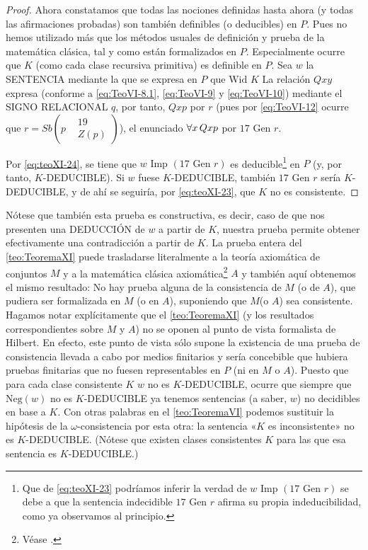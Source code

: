 \begin{proof}
    Ahora constatamos que todas las nociones definidas hasta ahora (y todas las afirmaciones probadas) son también definibles (o deducibles) en $P$. Pues no hemos utilizado más que los 
    métodos usuales de definición y prueba de la matemática clásica, tal y como están formalizados en $P$. Especialmente ocurre que $K$ (como cada clase recursiva primitiva) es definible en $P$. 
    Sea $w$ la SENTENCIA mediante la que se expresa en $P$ que $\text{Wid } K$ La relación $Qxy$ expresa (conforme a \eqref{eq:TeoVI-8.1}, \eqref{eq:TeoVI-9} y \eqref{eq:TeoVI-10}) mediante 
    el SIGNO RELACIONAL $q$, por tanto, $Qxp$ por $r$ (pues por \eqref{eq:TeoVI-12} ocurre que 
    $r = Sb\left(p
    \begin{aligned}
        &19 \\
        &Z(p)
    \end{aligned}
    \right)$), el enunciado $\forall x \thinspace Qxp$ por $17 \text{ Gen } r$.

    Por \eqref{eq:teoXI-24}, se tiene que $w \text{ Imp } (17 \text{ Gen } r)$ es deducible\footnote{Que de \eqref{eq:teoXI-23} podríamos inferir la verdad de $w \text{ Imp } (17 \text{ Gen } r)$ 
    se debe a que la sentencia indecidible $17 \text{ Gen } r$ afirma su propia indeducibilidad, como ya observamos al principio.} en $P$ (y, por tanto, $K$-DEDUCIBLE). Si $w$ fuese $K$-DEDUCIBLE,
    también $17 \text{ Gen } r$ sería $K$-DEDUCIBLE, y de ahí se seguiría, por \eqref{eq:teoXI-23}, que $K$ no es consistente.
\end{proof}

Nótese que también esta prueba es constructiva, es decir, caso de que nos presenten una DEDUCCIÓN de $w$ a partir de $K$, nuestra prueba permite obtener efectivamente una contradicción a partir 
de $K$. La prueba entera del \autoref{teo:TeoremaXI} puede trasladarse literalmente a la teoría axiomática de conjuntos $M$ y a la matemática clásica axiomática\footnote{Véase \cite{v1927hilbertschen}.} 
$A$ y también aquí obtenemos el mismo resultado: No hay prueba alguna de la consistencia de $M$ (o de $A$), que pudiera ser formalizada en $M$ (o en $A$), suponiendo que $M$(o $A$) sea consistente. 
Hagamos notar explícitamente que el \autoref{teo:TeoremaXI} (y los resultados correspondientes sobre $M$ y $A$) no se oponen al punto de vista formalista de Hilbert. En efecto, este punto de vista 
sólo supone la existencia de una prueba de consistencia llevada a cabo por medios finitarios y sería concebible que hubiera pruebas finitarias que no fuesen representables en $P$ (ni en $M$ o $A$).
Puesto que para cada clase consistente $K$ $w$ no es $K$-DEDUCIBLE, ocurre que siempre que $\text{Neg}(w)$ no es $K$-DEDUCIBLE ya tenemos sentencias (a saber, $w$) no decidibles en base a $K$.
Con otras palabras en el \autoref{teo:TeoremaVI} podemos sustituir la hipótesis de la $\omega$-consistencia por esta otra: la sentencia «$K$ es inconsistente» no es $K$-DEDUCIBLE. (Nótese que existen 
clases consistentes $K$ para las que esa sentencia es $K$-DEDUCIBLE.)

